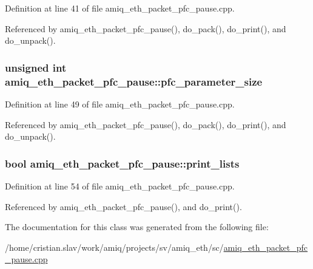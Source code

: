 Definition at line 41 of file amiq\_\-eth\_\-packet\_\-pfc\_\-pause.cpp.

Referenced by amiq\_\-eth\_\-packet\_\-pfc\_\-pause(), do\_\-pack(), do\_\-print(), and do\_\-unpack().\hypertarget{classamiq__eth__packet__pfc__pause_af7531f2b33d11bf9b841357d611bfd8f}{
\subsubsection[{pfc\_\-parameter\_\-size}]{\setlength{\rightskip}{0pt plus 5cm}unsigned int {\bf amiq\_\-eth\_\-packet\_\-pfc\_\-pause::pfc\_\-parameter\_\-size}}}
\label{classamiq__eth__packet__pfc__pause_af7531f2b33d11bf9b841357d611bfd8f}


Definition at line 49 of file amiq\_\-eth\_\-packet\_\-pfc\_\-pause.cpp.

Referenced by amiq\_\-eth\_\-packet\_\-pfc\_\-pause(), do\_\-pack(), do\_\-print(), and do\_\-unpack().\hypertarget{classamiq__eth__packet__pfc__pause_a83a474ef0ddf54b1a5d67d4ec155fb37}{
\subsubsection[{print\_\-lists}]{\setlength{\rightskip}{0pt plus 5cm}bool {\bf amiq\_\-eth\_\-packet\_\-pfc\_\-pause::print\_\-lists}}}
\label{classamiq__eth__packet__pfc__pause_a83a474ef0ddf54b1a5d67d4ec155fb37}


Definition at line 54 of file amiq\_\-eth\_\-packet\_\-pfc\_\-pause.cpp.

Referenced by amiq\_\-eth\_\-packet\_\-pfc\_\-pause(), and do\_\-print().

The documentation for this class was generated from the following file:\begin{DoxyCompactItemize}
\item 
/home/cristian.slav/work/amiq/projects/sv/amiq\_\-eth/sc/\hyperlink{amiq__eth__packet__pfc__pause_8cpp}{amiq\_\-eth\_\-packet\_\-pfc\_\-pause.cpp}\end{DoxyCompactItemize}

